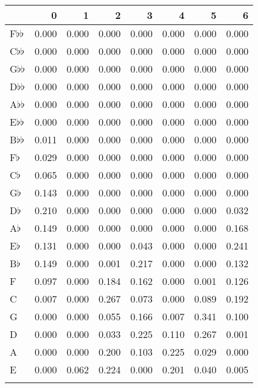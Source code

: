 \begin{tabular}{lrrrrrrr}
\toprule
{} &      0 &      1 &      2 &      3 &      4 &      5 &      6 \\
\midrule
F$\flat$$\flat$   &  0.000 &  0.000 &  0.000 &  0.000 &  0.000 &  0.000 &  0.000 \\
C$\flat$$\flat$   &  0.000 &  0.000 &  0.000 &  0.000 &  0.000 &  0.000 &  0.000 \\
G$\flat$$\flat$   &  0.000 &  0.000 &  0.000 &  0.000 &  0.000 &  0.000 &  0.000 \\
D$\flat$$\flat$   &  0.000 &  0.000 &  0.000 &  0.000 &  0.000 &  0.000 &  0.000 \\
A$\flat$$\flat$   &  0.000 &  0.000 &  0.000 &  0.000 &  0.000 &  0.000 &  0.000 \\
E$\flat$$\flat$   &  0.000 &  0.000 &  0.000 &  0.000 &  0.000 &  0.000 &  0.000 \\
B$\flat$$\flat$   &  0.011 &  0.000 &  0.000 &  0.000 &  0.000 &  0.000 &  0.000 \\
F$\flat$          &  0.029 &  0.000 &  0.000 &  0.000 &  0.000 &  0.000 &  0.000 \\
C$\flat$          &  0.065 &  0.000 &  0.000 &  0.000 &  0.000 &  0.000 &  0.000 \\
G$\flat$          &  0.143 &  0.000 &  0.000 &  0.000 &  0.000 &  0.000 &  0.000 \\
D$\flat$          &  0.210 &  0.000 &  0.000 &  0.000 &  0.000 &  0.000 &  0.032 \\
A$\flat$          &  0.149 &  0.000 &  0.000 &  0.000 &  0.000 &  0.000 &  0.168 \\
E$\flat$          &  0.131 &  0.000 &  0.000 &  0.043 &  0.000 &  0.000 &  0.241 \\
B$\flat$          &  0.149 &  0.000 &  0.001 &  0.217 &  0.000 &  0.000 &  0.132 \\
F                 &  0.097 &  0.000 &  0.184 &  0.162 &  0.000 &  0.001 &  0.126 \\
C                 &  0.007 &  0.000 &  0.267 &  0.073 &  0.000 &  0.089 &  0.192 \\
G                 &  0.000 &  0.000 &  0.055 &  0.166 &  0.007 &  0.341 &  0.100 \\
D                 &  0.000 &  0.000 &  0.033 &  0.225 &  0.110 &  0.267 &  0.001 \\
A                 &  0.000 &  0.000 &  0.200 &  0.103 &  0.225 &  0.029 &  0.000 \\
E                 &  0.000 &  0.062 &  0.224 &  0.000 &  0.201 &  0.040 &  0.005 \\
$$
\end{tabular}
